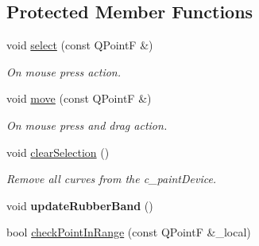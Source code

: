 \subsection*{Protected Member Functions}
\begin{DoxyCompactItemize}
\item 
\mbox{\label{classRectTool_aa24f7207666cb72fd396862c6013ab3b}} 
void \mbox{\hyperlink{classRectTool_aa24f7207666cb72fd396862c6013ab3b}{select}} (const Q\+PointF \&)
\begin{DoxyCompactList}\small\item\em On mouse press action. \end{DoxyCompactList}\item 
\mbox{\label{classRectTool_a21478352a886535737011ed50b876f72}} 
void \mbox{\hyperlink{classRectTool_a21478352a886535737011ed50b876f72}{move}} (const Q\+PointF \&)
\begin{DoxyCompactList}\small\item\em On mouse press and drag action. \end{DoxyCompactList}\item 
\mbox{\label{classRectTool_ac1f75f3000ecc9549b81f918384b9802}} 
void \mbox{\hyperlink{classRectTool_ac1f75f3000ecc9549b81f918384b9802}{clear\+Selection}} ()
\begin{DoxyCompactList}\small\item\em Remove all curves from the c\+\_\+paint\+Device. \end{DoxyCompactList}\item 
\mbox{\label{classRectTool_a920b87fd4186cecd879240480e246c34}} 
void {\bfseries update\+Rubber\+Band} ()
\item 
bool \mbox{\hyperlink{classTool_a81244366dc1b9f55465ed6f37b81033c}{check\+Point\+In\+Range}} (const Q\+PointF \&\+\_\+local)
\end{DoxyCompactItemize}
